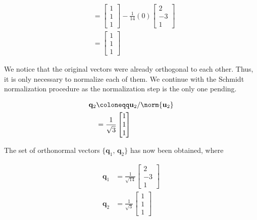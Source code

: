 \begin{align*}
&= \begin{bmatrix}
    1 \\ 1 \\1
   \end{bmatrix}
   -
   \frac{1}{14}
(0)
\begin{bmatrix}
 2\\-3\\1
\end{bmatrix}\\
&= \begin{bmatrix}
    1 \\ 1 \\1
   \end{bmatrix}
\end{align*}

We notice that the original vectors were already orthogonal to each other.
Thus, it is only necessary to normalize each of them.
We continue with the Schmidt normalization procedure as the normalization step is the only one pending.

\begin{align*}
 \mathbf{q}_2 & \coloneqq \mathbf{u}_2 / \norm{\mathbf{u}_2}\\
 & = \frac{1}{\sqrt{3}} \begin{bmatrix}
      1\\1\\1
     \end{bmatrix}
\end{align*}

The set of orthonormal vectors $\{\mathbf{q}_1, \, \mathbf{q}_2\}$ has now been obtained, where

\begin{align*}
 \mathbf{q}_1 &= \frac{1}{\sqrt{14}} \begin{bmatrix}
                                      2\\-3\\1
                                     \end{bmatrix}
\\
\mathbf{q}_2 &= \frac{1}{\sqrt{3}} \begin{bmatrix}
                                      1\\1\\1
                                     \end{bmatrix}
\end{align*}
